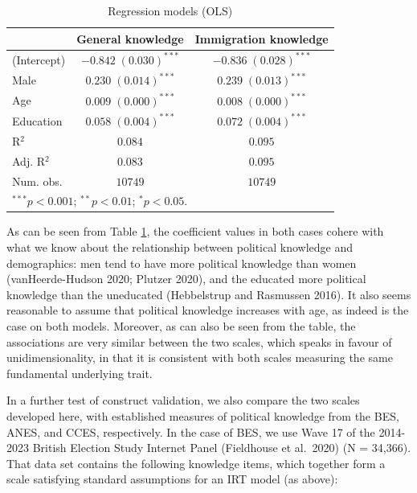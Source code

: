 \documentclass[11pt,halfline,a4paper,]{ouparticle}
\begin{document}
\begin{table}[h!]
\caption{Regression models (OLS)}
\begin{center}
\begin{tabular}{l c c}
\hline
 & General knowledge & Immigration knowledge \\
\hline
(Intercept) & $-0.842 \; (0.030)^{***}$ & $-0.836 \; (0.028)^{***}$ \\
Male        & $0.230 \; (0.014)^{***}$  & $0.239 \; (0.013)^{***}$  \\
Age         & $0.009 \; (0.000)^{***}$  & $0.008 \; (0.000)^{***}$  \\
Education   & $0.058 \; (0.004)^{***}$  & $0.072 \; (0.004)^{***}$  \\
\hline
R$^2$       & $0.084$                   & $0.095$                   \\
Adj. R$^2$  & $0.083$                   & $0.095$                   \\
Num. obs.   & $10749$                   & $10749$                   \\
\hline
\multicolumn{3}{l}{\scriptsize{$^{***}p<0.001$; $^{**}p<0.01$; $^{*}p<0.05$.}}
\end{tabular}
\label{tab:4}
\end{center}
\end{table}

As can be seen from Table \ref{tab:4}, the coefficient values in both
cases cohere with what we know about the relationship between political
knowledge and demographics: men tend to have more political knowledge
than women (vanHeerde-Hudson 2020; Plutzer 2020), and the educated more
political knowledge than the uneducated (Hebbelstrup and Rasmussen
2016). It also seems reasonable to assume that political knowledge
increases with age, as indeed is the case on both models. Moreover, as
can also be seen from the table, the associations are very similar
between the two scales, which speaks in favour of unidimensionality, in
that it is consistent with both scales measuring the same fundamental
underlying trait.

In a further test of construct validation, we also compare the two
scales developed here, with established measures of political knowledge
from the BES, ANES, and CCES, respectively. In the case of BES, we use
Wave 17 of the 2014-2023 British Election Study Internet Panel
(Fieldhouse et al.~2020) (N = 34,366). That data set contains the
following knowledge items, which together form a scale satisfying
standard assumptions for an IRT model (as above):
\end{document}
